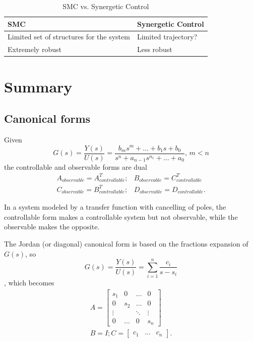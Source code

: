 \documentclass[a4paper]{report}
\begin{document}
\begin{table}[H]
    \centering
    \caption{SMC vs. Synergetic Control}
    \label{tab:smc-synergetic}
    \begin{tabularx}{0.8\textwidth}{X X}
	\toprule
	SMC & Synergetic Control \\
	\midrule
	Limited set of structures for the system & Limited trajectory? \\
	Extremely robust & Less robust \\
	\bottomrule
    \end{tabularx}
\end{table}

\pagebreak
\section*{Summary}

\subsection*{Canonical forms}

Given \[
    G(s) = \frac{Y(s)}{U(s)} = \frac{b_ms^{m}+\ldots+b_1s + b_0}{s^{n}+a_{n-1}s^{n_1}+\ldots+a_0}\text{, }m<n
\] the controllable and observable forms are dual
\begin{align*}
    A_{observable} = A_{controllable}^{T} ; & B_{observable} = C_{controllable}^{T} \\
    C_{observable} = B_{controllable}^{T} ; & D_{observable} = D_{controllable}
.\end{align*}

\begin{note}
    In a system modeled by a transfer function with cancelling of poles, the controllable form makes a controllable system but not observable, while the observable makes the opposite.
\end{note}

The Jordan (or diagonal) canonical form is based on the fractions expansion of $G(s)$, so \[
    G(s) = \frac{Y(s)}{U(s)} = \sum_{i=1}^{n} \frac{c_i}{s-s_i}
\], which becomes
\begin{align*}
    A =
    \begin{bmatrix}
	s_1 & 0 & \ldots & 0 \\
	0 & s_2 & \ldots & 0 \\
	\vdots & & \ddots & \vdots \\
	0 & \ldots & 0 & s_n
	\end{bmatrix} \\
	B = I ; C = \begin{bmatrix} c_1 & \ldots & c_n \end{bmatrix} 
.\end{align*}
\end{document}
